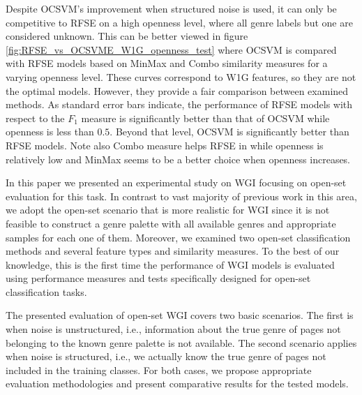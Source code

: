 \documentclass[runningheads]{llncs}
\begin{document}
Despite OCSVM's improvement when structured noise is used, it can only be competitive to RFSE on a high openness level, where all genre labels but one are considered unknown. This can be better viewed in figure \ref{fig:RFSE_vs_OCSVME_W1G_openness_test} where OCSVM is compared with RFSE models based on MinMax and Combo similarity measures for a varying openness level. These curves correspond to W1G features, so they are not the optimal models. However, they provide a fair comparison between examined methods. As standard error bars indicate, the performance of RFSE models with respect to the $F_{1}$ measure is significantly better than that of OCSVM while openness is less than $0.5$. Beyond that level, OCSVM is significantly better than RFSE models. Note also Combo measure helps RFSE in while openness is relatively low and MinMax seems to be a better choice when openness increases.

%

In this paper we presented an experimental study on WGI focusing on open-set evaluation for this task. In contrast to vast majority of previous work in this area, we adopt the open-set scenario that is more realistic for WGI since it is not feasible to construct a genre palette with all available genres and appropriate samples for each one of them. Moreover, we examined two open-set classification methods and several feature types and similarity measures. To the best of our knowledge, this is the first time the performance of WGI models is evaluated using performance measures and tests specifically designed for open-set classification tasks.

The presented evaluation of open-set WGI covers two basic scenarios. The first is when noise is unstructured, i.e., information about the true genre of pages not belonging to the known genre palette is not available. The second scenario applies when noise is structured, i.e., we actually know the true genre of pages not included in the training classes. For both cases, we propose appropriate evaluation methodologies and present comparative results for the tested models.
\end{document}
